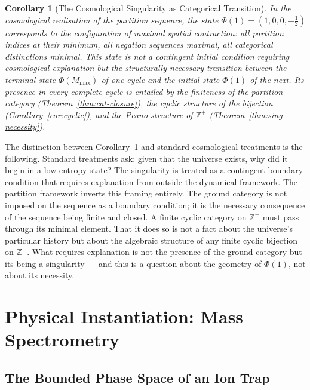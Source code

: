 \documentclass[twocolumn,10pt,a4paper]{article}
\theoremstyle{thmstyle}
\newtheorem{corollary}[theorem]{Corollary}
\theoremstyle{definition}
\theoremstyle{remark}
\newcommand{\Zp}{\mathbb{Z}^{+}}
\newcommand{\Mmax}{M_{\max}}
\newcommand{\PhiMap}{\varPhi}
\begin{document}
\begin{corollary}[The Cosmological Singularity as Categorical Transition]
\label{cor:big-bang}
In the cosmological realisation of the partition sequence, the state $\PhiMap(1) = (1, 0, 0, +\tfrac{1}{2})$ corresponds to the configuration of maximal spatial contraction: all partition indices at their minimum, all negation sequences maximal, all categorical distinctions minimal. This state is not a contingent initial condition requiring cosmological explanation but the structurally necessary transition between the terminal state $\PhiMap(\Mmax)$ of one cycle and the initial state $\PhiMap(1)$ of the next. Its presence in every complete cycle is entailed by the finiteness of the partition category (Theorem~\ref{thm:cat-closure}), the cyclic structure of the bijection (Corollary~\ref{cor:cyclic}), and the Peano structure of $\Zp$ (Theorem~\ref{thm:sing-necessity}).
\end{corollary}

The distinction between Corollary~\ref{cor:big-bang} and standard cosmological treatments \citep{penrose1979,penrose2010,hawking1985} is the following. Standard treatments ask: given that the universe exists, why did it begin in a low-entropy state? The singularity is treated as a contingent boundary condition that requires explanation from outside the dynamical framework. The partition framework inverts this framing entirely. The ground category is not imposed on the sequence as a boundary condition; it is the necessary consequence of the sequence being finite and closed. A finite cyclic category on $\Zp$ must pass through its minimal element. That it does so is not a fact about the universe's particular history but about the algebraic structure of any finite cyclic bijection on $\Zp$. What requires explanation is not the presence of the ground category but its being a singularity --- and this is a question about the geometry of $\PhiMap(1)$, not about its necessity.




\section{Physical Instantiation: Mass Spectrometry}
\label{sec:massspec}

\subsection{The Bounded Phase Space of an Ion Trap}
\end{document}

